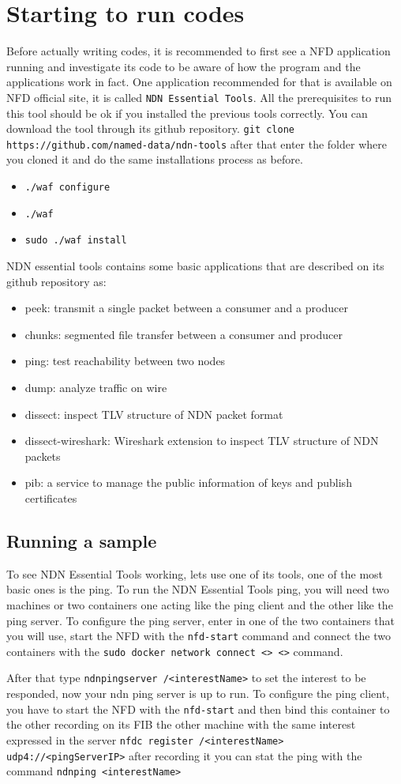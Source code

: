 \documentclass[10pt,letterpaper,extrafontsizes]{memoir}
\begin{document}
\chapter{Starting to run codes}
Before actually writing codes, it is recommended to first see a NFD application running and investigate its code to be aware of how the program and the applications work in fact.
One application recommended for that is available on NFD official site, it is called \texttt{NDN Essential Tools}. All the prerequisites to run this tool should be ok if you installed the previous tools correctly.
You can download the tool through its github repository. \texttt{git clone https://github.com/named-data/ndn-tools} after that enter the folder where you cloned it and do the same installations process as before.
\begin{itemize}
 \item \texttt{./waf configure} 
 \item \texttt{./waf}
 \item \texttt{sudo ./waf install}
\end{itemize}
NDN essential tools contains some basic applications that are described on its github repository as:

\begin{itemize}

\item    peek: transmit a single packet between a consumer and a producer
\item    chunks: segmented file transfer between a consumer and producer
\item    ping: test reachability between two nodes
\item    dump: analyze traffic on wire
\item    dissect: inspect TLV structure of NDN packet format
\item    dissect-wireshark: Wireshark extension to inspect TLV structure of NDN packets
\item    pib: a service to manage the public information of keys and publish certificates
\end{itemize}
\section{Running a sample}
To see NDN Essential Tools working, lets use one of its tools, one of the most basic ones is the ping. To run the NDN Essential Tools ping, you will need two machines or two containers one acting like the ping client and the other like the ping server.
To configure the ping server, enter in one of the two containers that you will use, start the NFD  with the \texttt{nfd-start} command and connect the two containers with the \texttt{sudo docker network connect <> <>} command. \par
After that type \texttt{ndnpingserver /<interestName>} to set the interest to be responded, now your ndn ping server is up to run.
To configure the ping client, you have to start the NFD  with the \texttt{nfd-start} and then bind this container to the other recording on its FIB the other machine with the same interest expressed in the server \texttt{nfdc register /<interestName> udp4://<pingServerIP>} after recording it you can stat the ping with the command \texttt{ndnping <interestName>}
\end{document}
